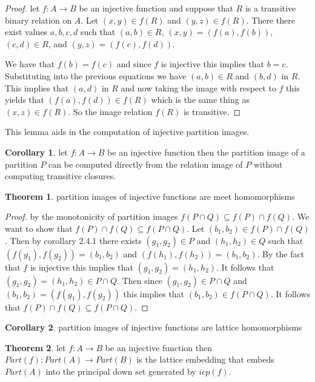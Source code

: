 \documentclass[a4paper,11pt, notitlepage]{report}
\theoremstyle{definition}
\newtheorem{theorem}{Theorem}[section]
\newtheorem{corollary}{Corollary}[section]
\begin{document}
\begin{proof}
let $f: A \to B$ be an injective function and suppose that $R$ is a transitive binary relation on $A$. Let $(x,y) \in f(R)$ and $(y,z) \in f(R)$. There there exist values $a,b,c,d$ such that $(a,b) \in R$, $(x,y) = (f(a),f(b))$, $(c,d) \in R$, and $(y,z) = (f(c),f(d))$.

We have that $f(b) = f(c)$ and since $f$ is injective this implies that $b = c$. Substituting into the previous equations we have $(a,b) \in R$ and $(b,d)$ in $R$. This implies that $(a,d)$ in $R$ and now taking the image with respect to $f$ this yields that $(f(a),f(d)) \in f(R)$ which is the same thing as $(x,z) \in f(R)$. So the image relation $f(R)$ is transitive.
\end{proof}

This lemma aids in the computation of injective partition images.

\begin{corollary}
let $f: A \to B$ be an injective function then the partition image of a partition $P$ can be computed directly from the relation image of $P$ without computing transitive closures.
\end{corollary}

\begin{theorem}
partition images of injective functions are meet homomorphisms
\end{theorem}

\begin{proof}
by the monotonicity of partition images $f(P \cap Q) \subseteq f(P) \cap f(Q)$. We want to show that $f(P) \cap f(Q) \subseteq f(P \cap Q)$. Let $(b_1,b_2) \in f(P) \cap f(Q)$. Then by corollary 2.4.1 there exists $(g_1,g_2) \in P$ and $(h_1,h_2) \in Q$ such that $(f(g_1),f(g_2)) = (b_1,b_2)$ and $(f(h_1),f(h_2)) = (b_1,b_2)$. By the fact that $f$ is injective this implies that $(g_1,g_2) = (h_1,h_2)$. It follows that $(g_1,g_2) = (h_1,h_2) \in P \cap Q$. Then since $(g_1,g_2) \in P \cap Q$ and $(b_1,b_2) = (f(g_1),f(g_2))$ this implies that $(b_1,b_2) \in f(P \cap Q)$. It follows that $f(P) \cap f(Q) \subseteq f(P \cap Q)$.
\end{proof}

\begin{corollary}
partition images of injective functions are lattice homomorphisms
\end{corollary}

\begin{theorem}
let $f : A \to B$ be an injective function then $Part(f): Part(A) \to Part(B)$ is the lattice embedding that embeds $Part(A)$ into the principal down set generated by $icp(f)$.
\end{theorem}
\end{document}
